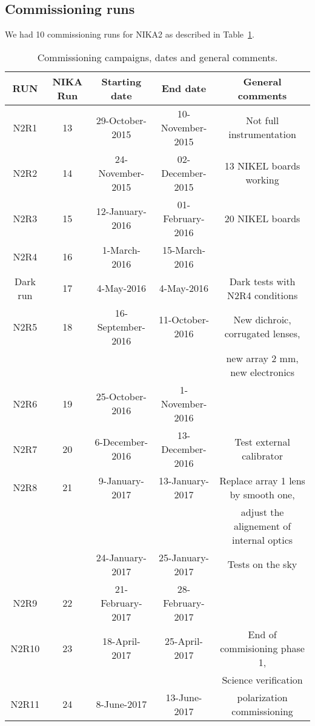\subsection{Commissioning runs}
We had 10 commissioning runs for NIKA2 as described in Table~\ref{nika2runs}.

\begin{table}[h]
\small
\begin{center} 
\begin{tabular}{|c|c|c|c|c|}
\hline 
RUN  & NIKA Run & Starting date    & End date         &  General comments \\
\hline
N2R1     & 13       & 29-October-2015   & 10-November-2015 & Not full instrumentation        \\
N2R2     & 14       & 24-November-2015  & 02-December-2015 & 13 NIKEL boards working         \\
N2R3     & 15       & 12-January-2016   & 01-February-2016 & 20 NIKEL boards                 \\
N2R4     & 16       & 1-March-2016      & 15-March-2016    & 	                               \\
Dark run & 17       & 4-May-2016        & 4-May-2016       & Dark tests with N2R4 conditions  \\
\hline
N2R5     & 18       & 16-September-2016 & 11-October-2016  & New dichroic, corrugated lenses, \\
         &          &                   &                  &  new array 2 mm, new electronics \\
N2R6     & 19       & 25-October-2016   & 1-November-2016  &                                  \\
N2R7     & 20       & 6-December-2016   & 13-December-2016 & Test external calibrator         \\
N2R8     & 21       & 9-January-2017    & 13-January-2017  & Replace array 1 lens by smooth one, \\
         &          &                   &                  &  adjust the alignement of internal optics \\ 
         &          & 24-January-2017   & 25-January-2017  & Tests on the sky   \\
N2R9     & 22       & 21-February-2017  & 28-February-2017 &                                   \\
N2R10    & 23       & 18-April-2017     & 25-April-2017    & End of commisioning phase 1,     \\
         &          &                   &                  & Science verification  \\  
N2R11  & 24       &  8-June-2017   & 13-June-2017  &  polarization commissioning  \\
\hline
\end{tabular}
\caption{Commissioning campaigns, dates and general comments.
\label{nika2runs}}
\end{center} 
\end{table} 
